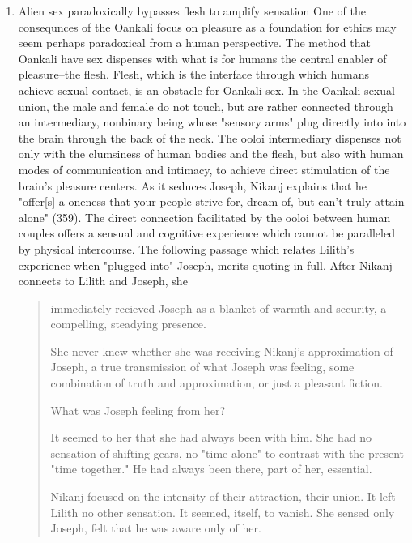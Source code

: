 \documentclass[11pt]{article}
\begin{document}
\begin{enumerate}
\item Alien sex paradoxically bypasses flesh to amplify sensation
\label{sec:orgd550407}
One of the consequnces of the Oankali focus on pleasure as a
foundation for ethics may seem perhaps paradoxical from a human
perspective. The method that Oankali have sex dispenses with what is
for humans the central enabler of pleasure--the flesh. Flesh, which is
the interface through which humans achieve sexual contact, is an
obstacle for Oankali sex. In the Oankali sexual union, the male and
female do not touch, but are rather connected through an intermediary,
nonbinary being whose "sensory arms" plug directly into into the brain
through the back of the neck. The ooloi intermediary dispenses not
only with the clumsiness of human bodies and the flesh, but also with
human modes of communication and intimacy, to achieve direct
stimulation of the brain's pleasure centers. As it seduces Joseph,
Nikanj explains that he "offer[s] a oneness that your people strive
for, dream of, but can't truly attain alone" (359). The direct
connection facilitated by the ooloi between human couples offers a
sensual and cognitive experience which cannot be paralleled by
physical intercourse. The following passage which relates Lilith's
experience when "plugged into" Joseph, merits quoting in full. After
Nikanj connects to Lilith and Joseph, she
\begin{quote}
immediately recieved Joseph as a blanket of warmth and security, a
compelling, steadying presence. 

She never knew whether she was receiving Nikanj's approximation of
Joseph, a true transmission of what Joseph was feeling, some
combination of truth and approximation, or just a pleasant fiction. 

What was Joseph feeling from her?

It seemed to her that she had always been with him. She had no
sensation of shifting gears, no "time alone" to contrast with the
present "time together." He had always been there, part of her,
essential. 

Nikanj focused on the intensity of their attraction, their union. It
left Lilith no other sensation. It seemed, itself, to vanish. She
sensed only Joseph, felt that he was aware only of her. 


\end{quote}
\end{enumerate}
\end{document}
